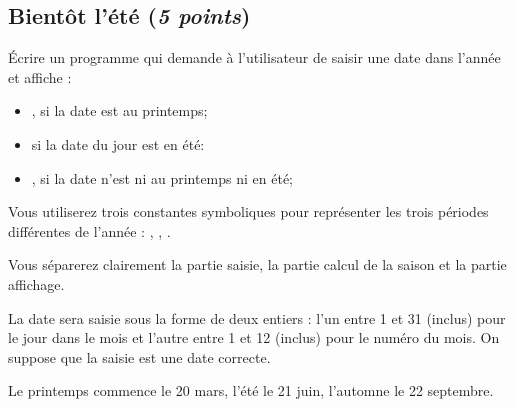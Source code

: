 \subsection{Bientôt l'été (\textit{5 points})}

Écrire un programme qui demande à l'utilisateur de saisir une date dans l'année et affiche :
\begin{itemize}
\item {}, si la date est au printemps;
\item {} si la date du jour est en été:
\item {}, si la date n'est ni au printemps ni en été;
\end{itemize}

Vous utiliserez trois constantes symboliques pour représenter les
trois périodes différentes de l'année : , ,
. 

Vous séparerez clairement la partie saisie, la partie
calcul de la saison et la partie affichage.

La date sera saisie sous la forme de deux entiers : l'un entre 1 et 31
(inclus) pour le jour dans le mois et l'autre entre 1 et 12 (inclus)
pour le numéro du mois. On suppose que la saisie est une date
correcte.

Le printemps commence le 20 mars, l'été le 21 juin, l'automne le 22
septembre.

